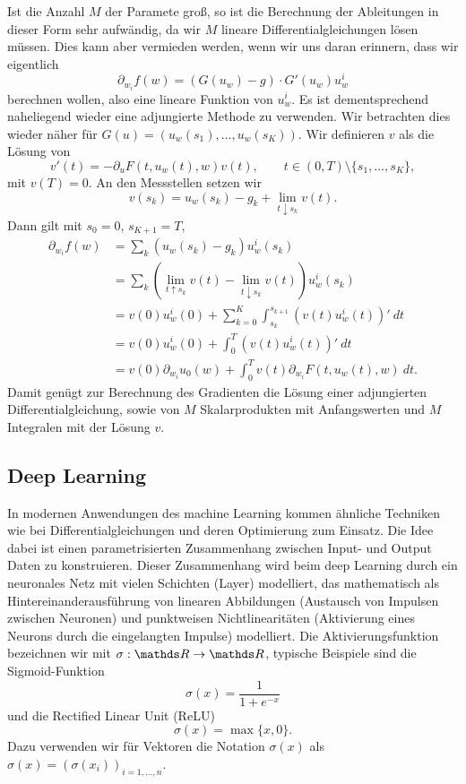 Ist die Anzahl $M$ der Paramete gro{\ss}, so ist die Berechnung der Ableitungen in dieser Form sehr aufwändig, da wir $M$ lineare Differentialgleichungen lösen müssen. Dies kann aber vermieden werden, wenn wir uns daran erinnern, dass wir eigentlich 
$$ \partial_{w_i} f(w) = (G(u_w) - g) \cdot G'(u_w) u_w^i $$ 
berechnen wollen, also eine lineare Funktion von $u_w^i$. Es ist dementsprechend naheliegend wieder eine adjungierte Methode zu verwenden. Wir betrachten dies wieder näher für $G(u) = (u_w(s_1),\ldots,u_w(s_K)). $ Wir definieren $v$ als die Lösung von
$$ v'(t) = - \partial_u F(t,u_w(t),w) v(t), \qquad t \in (0,T) \setminus \{s_1,\ldots,s_K\}, $$
mit $v(T) =0$. An den Messstellen setzen wir
$$ v(s_k) = u_w(s_k) - g_k +  \lim_{t \downarrow s_k} v(t) .   $$
Dann gilt mit $s_0=0$, $s_{K+1}=T$,
\begin{align*}
\partial_{w_i} f(w) &= \sum_k (u_w(s_k) - g_k)u_w^i(s_k) \\
&=  	\sum_k (\lim_{t \uparrow s_k} v(t) - \lim_{t \downarrow s_k} v(t))u_w^i(s_k) \\
&= v(0) u_w^i(0) + \sum_{k=0}^K \int_{s_k}^{s_{k+1}} (v(t)u_w^i(t))'~dt  \\
&= v(0) u_w^i(0) + \int_0^T (v(t)u_w^i(t))'~dt  \\
&= v(0) \partial_{w_i} u_0(w) + \int_0^T v(t) \partial_{w_i} F(t,u_w(t),w) ~dt  .
\end{align*}
Damit genügt zur Berechnung des Gradienten die Lösung einer adjungierten Differentialgleichung, sowie von $M$ Skalarprodukten mit Anfangswerten und $M$ Integralen mit der Lösung $v$.

\subsection{Deep Learning}

In modernen Anwendungen des machine Learning kommen ähnliche Techniken wie bei Differentialgleichungen und deren Optimierung zum Einsatz. Die Idee dabei ist einen parametrisierten Zusammenhang zwischen Input- und Output Daten zu konstruieren. Dieser Zusammenhang wird beim deep Learning durch ein neuronales Netz mit vielen Schichten (Layer) modelliert, das mathematisch als Hintereinanderausführung von linearen Abbildungen (Austausch von Impulsen zwischen Neuronen) und punktweisen Nichtlinearitäten (Aktivierung eines Neurons durch die eingelangten Impulse) modelliert. Die Aktivierungsfunktion bezeichnen wir mit $\sigma: \R \rightarrow \R$, typische Beispiele sind die Sigmoid-Funktion
$$ \sigma(x) = \frac{1}{1+e^{-x}}$$
und die Rectified Linear Unit (ReLU) 
$$ \sigma(x) =\max\{x,0\} . $$
Dazu verwenden wir für Vektoren die Notation $\sigma(x)$ als $\sigma(x) = (\sigma(x_i))_{i=1,\ldots,n}$. 

